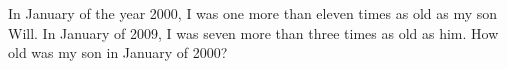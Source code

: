 In January of the year 2000, I was one more than eleven times as old as my son Will. In January of 2009, I was seven more than three times as old as him. How old was my son in January of 2000?
